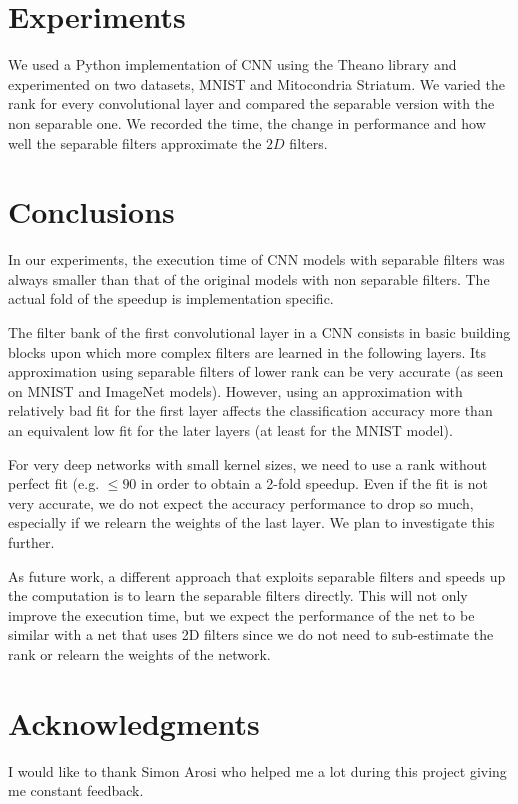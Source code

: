 \documentclass{article} %
\begin{document}
\section{Experiments}
We used a Python implementation of CNN using the Theano library and experimented on two datasets, MNIST and Mitocondria Striatum. 
We varied the rank for every convolutional layer and compared the separable version with the non separable one. We recorded the time, the change in performance and how well the separable filters approximate the $2D$ filters. 



\section{Conclusions}
In our experiments, the execution time of CNN models with separable filters was always smaller than that of the original models with non separable filters. The actual fold of the speedup is implementation specific.

The filter bank of the first convolutional layer in a CNN consists in basic building blocks upon which more complex filters are learned in the following layers. Its approximation using separable filters of lower rank  can be very accurate (as seen on MNIST and ImageNet models). However, using an approximation with relatively bad fit for the first layer affects the classification accuracy more than an equivalent low fit for the later layers (at least for the MNIST model).

For very deep networks with small kernel sizes, we need to use a rank without perfect fit (e.g. $\leq 90$ in order to obtain a 2-fold speedup. Even if the fit is not very accurate, we do not expect the accuracy performance to drop so much, especially if we relearn the weights of the last layer. We plan to investigate this further.

As future work, a different approach that exploits separable filters and speeds up the computation is to learn the separable filters directly. This will not only improve the execution time, but we expect the performance of the net to be similar with a net that uses 2D filters since we do not need to sub-estimate the rank or relearn the weights of the network.

\section*{Acknowledgments}
I would like to thank Simon Arosi who helped me a lot during this project giving me constant feedback.



\end{document}
